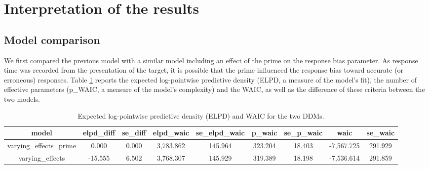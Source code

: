\documentclass[
  11pt,
  english,
  ,doc,floatsintext]{apa6}
\begin{document}
\hypertarget{interpretation-of-the-results}{%
\section{Interpretation of the results}\label{interpretation-of-the-results}}

\hypertarget{model-comparison}{%
\subsection{Model comparison}\label{model-comparison}}

We first compared the previous model with a similar model including an effect of the prime on the response bias parameter. As response time was recorded from the presentation of the target, it is possible that the prime influenced the response bias toward accurate (or erroneous) responses. Table \ref{tab:model_comparison} reports the expected log-pointwise predictive density (ELPD, a measure of the model's fit), the number of effective parameters (p\_WAIC, a measure of the model's complexity) and the WAIC, as well as the difference of these criteria between the two models.

\begin{table}[htb]

\begin{center}
\begin{threeparttable}

\caption{\label{tab:model_comparison}Expected log-pointwise predictive density (ELPD) and WAIC for the two DDMs.}

\tiny{

\begin{tabular}{ccccccccc}
\toprule
model & \multicolumn{1}{c}{elpd\_diff} & \multicolumn{1}{c}{se\_diff} & \multicolumn{1}{c}{elpd\_waic} & \multicolumn{1}{c}{se\_elpd\_waic} & \multicolumn{1}{c}{p\_waic} & \multicolumn{1}{c}{se\_p\_waic} & \multicolumn{1}{c}{waic} & \multicolumn{1}{c}{se\_waic}\\
\midrule
varying\_effects\_prime & 0.000 & 0.000 & 3,783.862 & 145.964 & 323.204 & 18.403 & -7,567.725 & 291.929\\
varying\_effects & -15.555 & 6.502 & 3,768.307 & 145.929 & 319.389 & 18.198 & -7,536.614 & 291.859\\
\bottomrule
\end{tabular}

}

\end{threeparttable}
\end{center}

\end{table}
\end{document}
